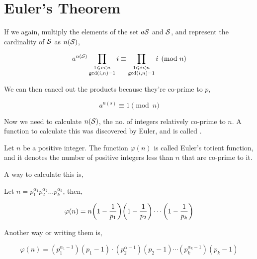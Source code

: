 \section{Euler's Theorem}

If we again, multiply the elements of the set \(a\mathcal{S}\) and \(\mathcal{S}\), and represent the cardinality of \(\mathcal{S}\) as \(n(\mathcal{S})\),

\begin{equation*}
    a^{n(\mathcal{S})} \prod_{\begin{subarray}{c} 1 \leqslant i < n \\ \gcd(i, n) = 1 \end{subarray}}i \equiv \prod_{\begin{subarray}{c} 1 \leqslant i < n \\ \gcd(i, n) = 1 \end{subarray}}i \pmod{n}
\end{equation*}

We can then cancel out the products because they're co-prime to \(p\), 

\begin{equation*}
    a^{n(s)} \equiv 1 \pmod{n}
\end{equation*}

Now we need to calculate \(n(\mathcal{S})\), the no. of integers relatively co-prime to \(n\).
A function to calculate this was discovered by Euler, and is called .

\begin{definition}
    Let \(n\) be a positive integer. The function \(\varphi(n)\) is called Euler's totient
    function, and it denotes the number of positive integers less than \(n\) that are co-prime to it.
\end{definition}

A way to calculate this is, 

\begin{theorem}
    Let \(n = p_1^{\alpha_1}p_2^{\alpha_2}\dots p_k^{\alpha_k}\), then,

    \begin{equation}
        \varphi(n) = n\qty(1 - \frac{1}{p_1})\qty(1 - \frac{1}{p_2})\cdots\qty(1 - \frac{1}{p_k})
    \end{equation} 
\end{theorem}

Another way or writing them is, 

\begin{equation}
    \varphi(n) = (p_1^{\alpha_1 - 1})(p_1-1) \cdot (p_2^{\alpha - 1})(p_2 - 1) \cdots (p_k^{\alpha_k - 1})(p_k - 1)
\end{equation}

